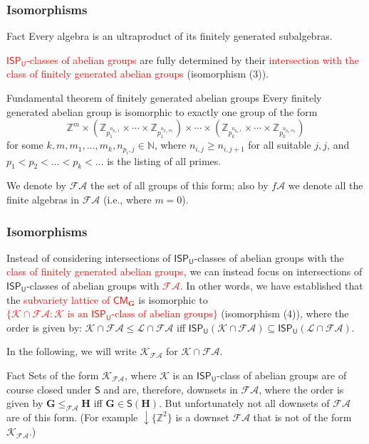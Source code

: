 \documentclass[professionalfont, handout, 10pt]{beamer} %
\theoremstyle{plain}
\theoremstyle{definition}
\newcommand{\m}[1]{{\mathbf {#1} }}
\begin{document}
\begin{frame}
\frametitle{Isomorphisms}
    \begin{block}{Fact}
        Every algebra is an ultraproduct of its finitely generated subalgebras.
    \end{block}
    \textcolor{red}{$\mathsf{ISP_U}$-classes of abelian groups} are fully determined by their \textcolor{red}{intersection with the class of finitely generated abelian groups} (isomorphism (3)).\pause

    \begin{block}{Fundamental theorem of finitely generated abelian groups}
        Every finitely generated abelian group is isomorphic to exactly one group of the form
        \[
            \mathbb{Z}^m \times (\mathbb{Z}_{p_1^{n_{p_1, 1}}} \times \cdots \times \mathbb{Z}_{p_1^{n_{p_1,m_1}}}) \times \cdots \times (\mathbb{Z}_{p_k^{n_{p_k, 1}}} \times \cdots \times \mathbb{Z}_{p_k^{n_{p_k,m_k}}})  
        \]
        for some $k, m, m_1, \dots, m_k,n_{p_i,j} \in \mathbb{N}$, where $n_{i,j} \geq n_{i,j+1}$ for all suitable $j,j$, and $p_1 < p_2< \dots < p_k < \ldots $ is the listing of all primes.
    \end{block}
    We denote by $\mathcal{FA}$ the set of all groups of this form; also by $f\mathcal{A}$ we denote all the finite algebras in $\mathcal{FA}$ (i.e., where $m=0$).
\end{frame}

\begin{frame}
\frametitle{Isomorphisms}
    Instead of considering intersections of $\mathsf{ISP_U}$-classes of abelian groups with the \textcolor{red}{class of finitely generated abelian groups}, we can instead focus on intersections of $\mathsf{ISP_U}$-classes of abelian groups with \textcolor{red}{$\mathcal{FA}$}.\pause
    In other words, we have established that the \textcolor{red}{subvariety lattice of $\mathsf{CM}_{\mathbf{G}}$} is isomorphic to \textcolor{red}{$\{\mathcal{K} \cap \mathcal{FA} : \mathcal{K} \text{ is an } \mathsf{ISP_U} \text{-class of abelian groups}\}$} (isomorphism (4)), where the order is given by: $\mathcal{K} \cap \mathcal{FA} \leq \mathcal{L} \cap \mathcal{FA}$ iff
    $\mathsf{ISP_U}(\mathcal{K} \cap \mathcal{FA}) \subseteq \mathsf{ISP_U}(\mathcal{L} \cap \mathcal{FA})$.

    In the following, we will write $\mathcal{K}_{ \mathcal{FA}}$ for $\mathcal{K} \cap \mathcal{FA}$.\pause
    \begin{block}{Fact}
        Sets of the form $\mathcal{K}_{\mathcal{FA}}$, where $\mathcal{K}$ is an $\mathsf{ISP_U}$-class of abelian groups are of course closed under $\mathsf{S}$ and are, therefore, downsets in $\mathcal{FA}$, where the order is given by $\m G \leq_{\mathcal{FA}} \m H$ iff $\m G \in \mathsf{S}(\m H)$.
        But unfortunately not all downsets of $\mathcal{FA}$ are of this form.
        (For example ${\downarrow} \{\mathbb{Z}^2\}$ is a downset $\mathcal{FA}$ that is not of the form  $\mathcal{K}_{\mathcal{FA}}$.)
    \end{block}
\end{frame}
\end{document}
